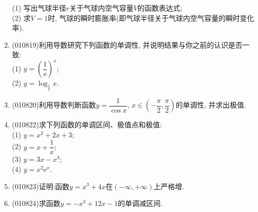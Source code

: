 \documentclass[10pt,a4paper]{article}
\begin{document}
\begin{enumerate}[1.]
(1) 写出气球半径$r$关于气球内空气容量$V$的函数表达式;\\
(2) 求$V=1$时, 气球的瞬时膨胀率(即气球半径关于气球内空气容量的瞬时变化率).
\item {\tiny (010819)}利用导数研究下列函数的单调性, 并说明结果与你之前的认识是否一致:\\
(1) $y=(\dfrac 1{\mathrm{e}})^x$;\\
(2) $y=\log_{\frac 1{\mathrm{e}}}x$.
\item {\tiny (010820)}利用导数判断函数$y= \dfrac 1{\cos x}$, $x\in (-\dfrac\pi 2, \dfrac \pi 2)$的单调性, 并求出极值.
\item {\tiny (010822)}求下列函数的单调区间、极值点和极值:\\
(1) $y=x^2+2x+3$;\\
(2) $y=x+\dfrac 1x$;\\
(3) $y=3x-x^3$;\\
(4) $y=x^2\mathrm{e}^x$.
\item {\tiny (010823)}证明:函数$y=x^3+4x$在$(-\infty, +\infty)$上严格增.
\item {\tiny (010824)}求函数$y=-x^3+12x-1$的单调减区间.
\end{enumerate}
\end{document}
